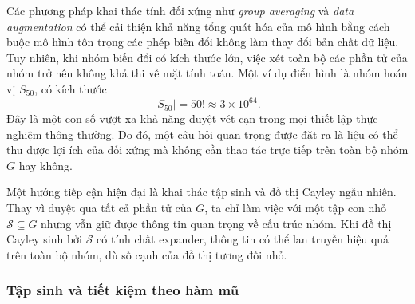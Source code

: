 %

Các phương pháp khai thác tính đối xứng như \textit{group averaging} và \textit{data augmentation} có thể cải thiện khả năng tổng quát hóa của mô hình bằng cách buộc mô hình tôn trọng các phép biến đổi không làm thay đổi bản chất dữ liệu. Tuy nhiên, khi nhóm biến đổi có kích thước lớn, việc xét toàn bộ các phần tử của nhóm trở nên không khả thi về mặt tính toán. Một ví dụ điển hình là nhóm hoán vị $S_{50}$, có kích thước
\begin{equation}
    |S_{50}| = 50! \approx 3 \times 10^{64}.
    \label{eq:s50-size}
\end{equation}
Đây là một con số vượt xa khả năng duyệt vét cạn trong mọi thiết lập thực nghiệm thông thường. Do đó, một câu hỏi quan trọng được đặt ra là liệu có thể thu được lợi ích của đối xứng mà không cần thao tác trực tiếp trên toàn bộ nhóm $G$ hay không.

Một hướng tiếp cận hiện đại là khai thác tập sinh và đồ thị Cayley ngẫu nhiên. Thay vì duyệt qua tất cả phần tử của $G$, ta chỉ làm việc với một tập con nhỏ $\mathcal{S} \subseteq G$ nhưng vẫn giữ được thông tin quan trọng về cấu trúc nhóm. Khi đồ thị Cayley sinh bởi $\mathcal{S}$ có tính chất expander, thông tin có thể lan truyền hiệu quả trên toàn bộ nhóm, dù số cạnh của đồ thị tương đối nhỏ.

\subsubsection{Tập sinh và tiết kiệm theo hàm mũ}

